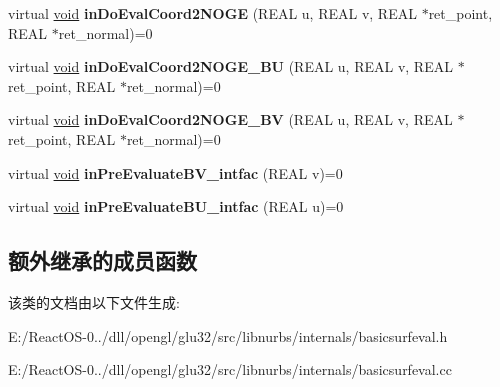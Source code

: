 \begin{DoxyCompactItemize}
\item 
\mbox{\label{class_basic_surface_evaluator_a7668903f33deb5f9e1efb3cae73ae135}} 
virtual \hyperlink{interfacevoid}{void} {\bfseries in\+Do\+Eval\+Coord2\+N\+O\+GE} (R\+E\+AL u, R\+E\+AL v, R\+E\+AL $\ast$ret\+\_\+point, R\+E\+AL $\ast$ret\+\_\+normal)=0
\item 
\mbox{\label{class_basic_surface_evaluator_a92f619917392d58fb61bece15f13b3fd}} 
virtual \hyperlink{interfacevoid}{void} {\bfseries in\+Do\+Eval\+Coord2\+N\+O\+G\+E\+\_\+\+BU} (R\+E\+AL u, R\+E\+AL v, R\+E\+AL $\ast$ret\+\_\+point, R\+E\+AL $\ast$ret\+\_\+normal)=0
\item 
\mbox{\label{class_basic_surface_evaluator_a83b823ae5eb526a27823b3b5528aa7b4}} 
virtual \hyperlink{interfacevoid}{void} {\bfseries in\+Do\+Eval\+Coord2\+N\+O\+G\+E\+\_\+\+BV} (R\+E\+AL u, R\+E\+AL v, R\+E\+AL $\ast$ret\+\_\+point, R\+E\+AL $\ast$ret\+\_\+normal)=0
\item 
\mbox{\label{class_basic_surface_evaluator_a1422c3ddcc2972b55731c2e640e5870a}} 
virtual \hyperlink{interfacevoid}{void} {\bfseries in\+Pre\+Evaluate\+B\+V\+\_\+intfac} (R\+E\+AL v)=0
\item 
\mbox{\label{class_basic_surface_evaluator_a11a8684d4c5a6409d07657da16364140}} 
virtual \hyperlink{interfacevoid}{void} {\bfseries in\+Pre\+Evaluate\+B\+U\+\_\+intfac} (R\+E\+AL u)=0
\end{DoxyCompactItemize}
\subsection*{额外继承的成员函数}


该类的文档由以下文件生成\+:\begin{DoxyCompactItemize}
\item 
E\+:/\+React\+O\+S-\/0../dll/opengl/glu32/src/libnurbs/internals/basicsurfeval.\+h\item 
E\+:/\+React\+O\+S-\/0../dll/opengl/glu32/src/libnurbs/internals/basicsurfeval.\+cc\end{DoxyCompactItemize}
